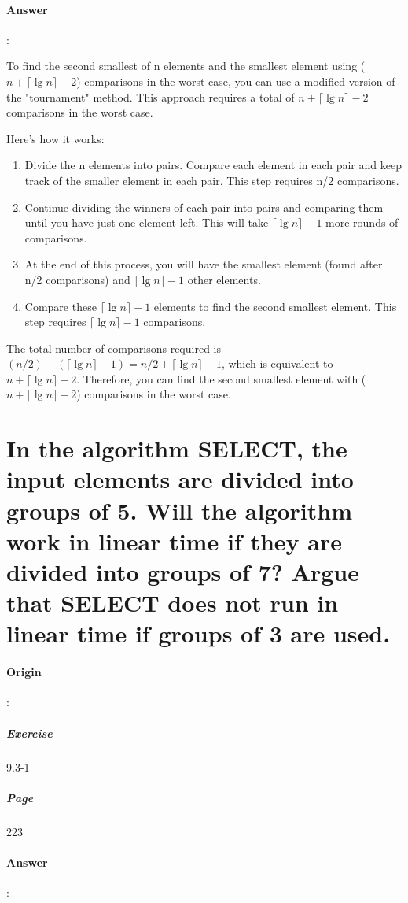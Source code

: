 \documentclass{article}
\begin{document}
\paragraph{Answer}:


To find the second smallest of n elements and the smallest element using ($n + \lceil \lg n \rceil - 2$) comparisons in the worst case, you can use a modified version of the "tournament" method. This approach requires a total of $n + \lceil \lg n \rceil - 2$ comparisons in the worst case.

Here's how it works:

\begin{enumerate}
  \item Divide the n elements into pairs. Compare each element in each pair and keep track of the smaller element in each pair. This step requires n/2 comparisons.
  \item Continue dividing the winners of each pair into pairs and comparing them until you have just one element left. This will take $\lceil \lg n \rceil - 1$ more rounds of comparisons.
  \item At the end of this process, you will have the smallest element (found after n/2 comparisons) and $\lceil \lg n\rceil - 1$ other elements.
  \item Compare these $\lceil \lg n\rceil - 1$ elements to find the second smallest element. This step requires $\lceil \lg n\rceil - 1$ comparisons.

\end{enumerate}

The total number of comparisons required is $(n/2) + (\lceil \lg n \rceil - 1) = n/2 + \lceil \lg n \rceil - 1$, which is equivalent to $n + \lceil \lg n \rceil - 2$. Therefore, you can find the second smallest element with ($n + \lceil \lg n \rceil - 2$) comparisons in the worst case.

\section{In the algorithm SELECT, the input elements are divided into groups of 5. Will the algorithm work in linear time if they are divided into groups of 7? Argue that SELECT does not run in linear time if groups of 3 are used.}
\paragraph{Origin}:
  \subparagraph{Exercise}9.3-1
  \subparagraph{Page}223
\paragraph{Answer}:
\end{document}
